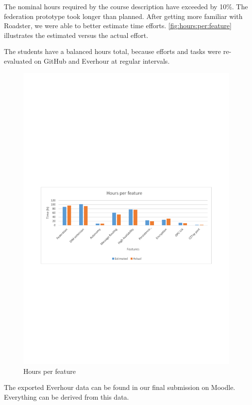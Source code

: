 The nominal hours required by the course description have exceeded by 10\%.
The federation prototype took longer than planned. After getting more familiar with Roadster, we were able to better estimate time efforts.
\autoref{fig:hours:per:feature} illustrates the estimated versus the actual effort.

The students have a balanced hours total, because efforts and tasks were
re-evaluated on GitHub and Everhour at regular intervals.


\begin{figure}[]
	\includegraphics[trim=2cm 10.5cm 2cm 11.9cm, clip=true, width=\textwidth]{img/project_monitoring_hours_per_feature_diagram.pdf}
	\caption{Hours per feature}
	\label{fig:hours:per:feature}
\end{figure}

The exported Everhour data can be found in our final submission on Moodle. Everything can be derived from this data.

